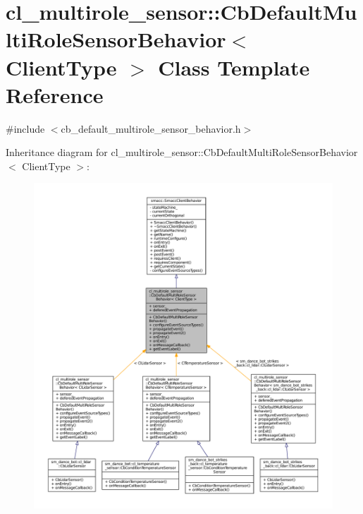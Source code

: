 \hypertarget{classcl__multirole__sensor_1_1CbDefaultMultiRoleSensorBehavior}{}\section{cl\+\_\+multirole\+\_\+sensor\+:\+:Cb\+Default\+Multi\+Role\+Sensor\+Behavior$<$ Client\+Type $>$ Class Template Reference}
\label{classcl__multirole__sensor_1_1CbDefaultMultiRoleSensorBehavior}


{\ttfamily \#include $<$cb\+\_\+default\+\_\+multirole\+\_\+sensor\+\_\+behavior.\+h$>$}



Inheritance diagram for cl\+\_\+multirole\+\_\+sensor\+:\+:Cb\+Default\+Multi\+Role\+Sensor\+Behavior$<$ Client\+Type $>$\+:
\nopagebreak
\begin{figure}[H]
\begin{center}
\leavevmode
\includegraphics[width=350pt]{classcl__multirole__sensor_1_1CbDefaultMultiRoleSensorBehavior__inherit__graph}
\end{center}
\end{figure}


